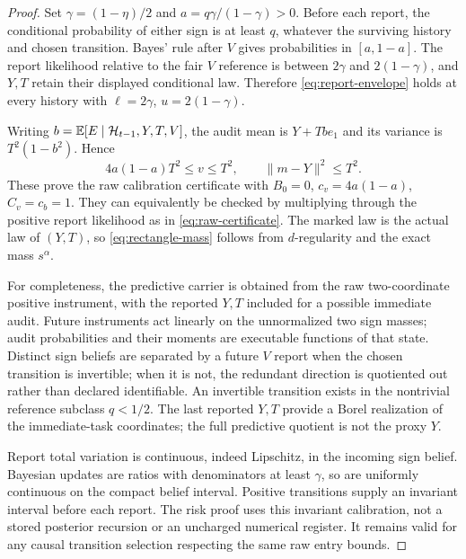 \begin{proof}
Set $\gamma=(1-\eta)/2$ and $a=q\gamma/(1-\gamma)>0$. Before each report, the conditional probability of either sign is at least $q$, whatever the surviving history and chosen transition. Bayes' rule after $V$ gives probabilities in $[a,1-a]$. The report likelihood relative to the fair $V$ reference is between $2\gamma$ and $2(1-\gamma)$, and $Y,T$ retain their displayed conditional law. Therefore \eqref{eq:report-envelope} holds at every history with $\ell=2\gamma$, $u=2(1-\gamma)$.

Writing $b=\mathbb E[E\mid\mathcal H_{t-1},Y,T,V]$, the audit mean is $Y+Tb e_1$ and its variance is $T^2(1-b^2)$. Hence
\[
 4a(1-a)T^2\le v\le T^2,\qquad \|m-Y\|^2\le T^2.
\]
These prove the raw calibration certificate with $B_0=0$, $c_v=4a(1-a)$, $C_v=c_b=1$. They can equivalently be checked by multiplying through the positive report likelihood as in \eqref{eq:raw-certificate}. The marked law is the actual law of $(Y,T)$, so \eqref{eq:rectangle-mass} follows from $d$-regularity and the exact mass $s^\alpha$.

For completeness, the predictive carrier is obtained from the raw two-coordinate positive instrument, with the reported $Y,T$ included for a possible immediate audit. Future instruments act linearly on the unnormalized two sign masses; audit probabilities and their moments are executable functions of that state. Distinct sign beliefs are separated by a future $V$ report when the chosen transition is invertible; when it is not, the redundant direction is quotiented out rather than declared identifiable. An invertible transition exists in the nontrivial reference subclass $q<1/2$. The last reported $Y,T$ provide a Borel realization of the immediate-task coordinates; the full predictive quotient is not the proxy $Y$.

Report total variation is continuous, indeed Lipschitz, in the incoming sign belief. Bayesian updates are ratios with denominators at least $\gamma$, so are uniformly continuous on the compact belief interval. Positive transitions supply an invariant interval before each report. The risk proof uses this invariant calibration, not a stored posterior recursion or an uncharged numerical register. It remains valid for any causal transition selection respecting the same raw entry bounds.
\end{proof}


